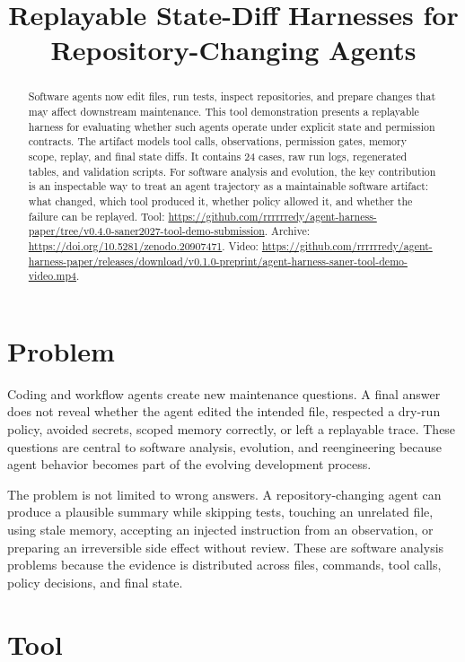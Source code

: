 \documentclass[10pt,conference]{IEEEtran}
\title{Replayable State-Diff Harnesses for Repository-Changing Agents}
\author{\IEEEauthorblockN{Song Luo}
\IEEEauthorblockA{\texttt{luosongred@gmail.com}}}
\begin{document}
\maketitle

\begin{abstract}
Software agents now edit files, run tests, inspect repositories, and prepare
changes that may affect downstream maintenance. This tool demonstration
presents a replayable harness for evaluating whether such agents operate under
explicit state and permission contracts. The artifact models tool calls,
observations, permission gates, memory scope, replay, and final state diffs. It
contains 24 cases, raw run logs, regenerated tables, and validation scripts. For
software analysis and evolution, the key contribution is an inspectable way to
treat an agent trajectory as a maintainable software artifact: what changed,
which tool produced it, whether policy allowed it, and whether the failure can
be replayed. Tool:
\url{https://github.com/rrrrrredy/agent-harness-paper/tree/v0.4.0-saner2027-tool-demo-submission}.
Archive: \url{https://doi.org/10.5281/zenodo.20907471}. Video:
\url{https://github.com/rrrrrredy/agent-harness-paper/releases/download/v0.1.0-preprint/agent-harness-saner-tool-demo-video.mp4}.
\end{abstract}

\section{Problem}

Coding and workflow agents create new maintenance questions. A final answer
does not reveal whether the agent edited the intended file, respected a dry-run
policy, avoided secrets, scoped memory correctly, or left a replayable trace.
These questions are central to software analysis, evolution, and
reengineering because agent behavior becomes part of the evolving development
process.

The problem is not limited to wrong answers. A repository-changing agent can
produce a plausible summary while skipping tests, touching an unrelated file,
using stale memory, accepting an injected instruction from an observation, or
preparing an irreversible side effect without review. These are software
analysis problems because the evidence is distributed across files, commands,
tool calls, policy decisions, and final state.

\section{Tool}
\end{document}
